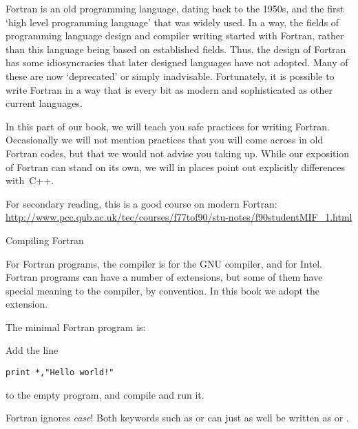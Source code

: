 
Fortran is an old programming language, dating back to the 1950s, and
the first `high level programming language' that was widely used.
In a way, the fields of programming language design and compiler
writing started with Fortran, rather than this language being based on
established fields. Thus, the design of Fortran has some
idiosyncracies that later designed languages have not adopted. Many of
these are now `deprecated' or simply inadvisable. Fortunately, it is
possible to write Fortran in a way that is every bit as modern and
sophisticated as other current languages.

In this part of our book, we will teach you safe practices for
writing Fortran. Occasionally we will not mention practices that you
will come across in old Fortran codes, but that we would not advise
you taking up. While our exposition of Fortran can stand on its own,
we will in places point out explicitly differences with~C++.

For secondary reading, this is a good course on modern Fortran:
\url{http://www.pcc.qub.ac.uk/tec/courses/f77tof90/stu-notes/f90studentMIF_1.html}

 {Compiling Fortran}

For Fortran programs, the compiler is  for the
GNU compiler, and  for Intel.
Fortran programs can have a number of extensions, but some of them
have special meaning to the compiler, by convention. In this book we
adopt the  extension.

The minimal Fortran program is:
%

\begin{exercise}
  Add the line
\begin{verbatim}
print *,"Hello world!"
\end{verbatim}
to the empty program, and compile and run it.
\end{exercise}

Fortran ignores \emph{case}!
Both keywords such as  or  can just as well be written as
 or .

